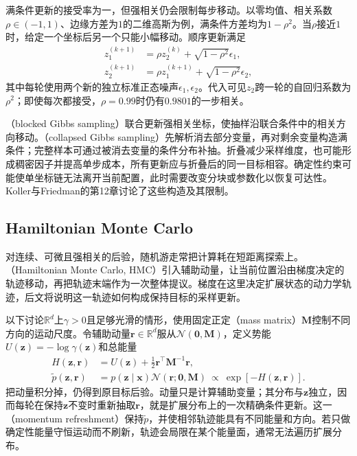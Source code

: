 满条件更新的接受率为一，但强相关仍会限制每步移动。以零均值、相关系数$\rho\in(-1,1)$、边缘方差为$1$的二维高斯为例，满条件方差均为$1-\rho^2$。当$\rho$接近$1$时，给定一个坐标后另一个只能小幅移动。顺序更新满足
\[
  \begin{aligned}
    z_1^{(k+1)}&=\rho z_2^{(k)}+\sqrt{1-\rho^2}\epsilon_1,\\
    z_2^{(k+1)}&=\rho z_1^{(k+1)}+\sqrt{1-\rho^2}\epsilon_2,
  \end{aligned}
\]
其中每轮使用两个新的独立标准正态噪声$\epsilon_1,\epsilon_2$。代入可见$z_2$跨一轮的自回归系数为$\rho^2$；即使每次都接受，$\rho=0.99$时仍有$0.9801$的一步相关。

（blocked Gibbs sampling）联合更新强相关坐标，使抽样沿联合条件中的相关方向移动。（collapsed Gibbs sampling）先解析消去部分变量，再对剩余变量构造满条件；完整样本可通过被消去变量的条件分布补抽。折叠减少采样维度，也可能形成稠密因子并提高单步成本，所有更新应与折叠后的同一目标相容。确定性约束可能使单坐标链无法离开当前配置，此时需要改变分块或参数化以恢复可达性。Koller与Friedman的第12章讨论了这些构造及其限制。

\subsection{Hamiltonian Monte Carlo}
\label{sec:pgm-sampling-hmc}

对连续、可微且强相关的后验，随机游走常把计算耗在短距离探索上。（Hamiltonian Monte Carlo, HMC）引入辅助动量，让当前位置沿由梯度决定的轨迹移动，再把轨迹末端作为一次整体提议。梯度在这里决定扩展状态的动力学轨迹，后文将说明这一轨迹如何构成保持目标的采样更新。

以下讨论$\mathbb{R}^{d}$上$\gamma>0$且足够光滑的情形，使用固定正定（mass matrix）$\bm{M}$控制不同方向的运动尺度。令辅助动量$\bm{r}\in\mathbb{R}^{d}$服从$\mathcal{N}(\bm{0},\bm{M})$，定义势能$U(\bm{z})=-\log\gamma(\bm{z})$和总能量
\begin{equation}
  \begin{aligned}
    H(\bm{z},\bm{r})&=U(\bm{z})+\frac12\bm{r}^{\top}\bm{M}^{-1}\bm{r},\\
    \widetilde p(\bm{z},\bm{r})
      &=p(\bm{z}\mid\bm{x})\mathcal{N}(\bm{r};\bm{0},\bm{M})
        \ \propto\ \exp[-H(\bm{z},\bm{r})].
  \end{aligned}
  \label{eq:pgm-sampling-hamiltonian}
\end{equation}
把动量积分掉，仍得到原目标后验。动量只是计算辅助变量；其分布与$\bm{z}$独立，因而每轮在保持$\bm{z}$不变时重新抽取$\bm{r}$，就是扩展分布上的一次精确条件更新。这一（momentum refreshment）保持$\widetilde p$，并使相邻轨迹能具有不同能量和方向。若只做确定性能量守恒运动而不刷新，轨迹会局限在某个能量面，通常无法遍历扩展分布。


